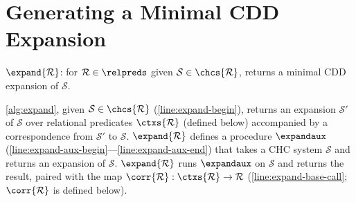 \section{Generating a Minimal CDD Expansion}
\label{app:cons-cdd}
\begin{algorithm}[t]
  \caption{$\expand{ \mathcal{R} }$: for $\mathcal{R} \in \relpreds$
    given $\mathcal{S} \in \chcs{ \mathcal{R} }$, returns a minimal
    CDD expansion of $\mathcal{S}$. }
  \label{alg:expand}
\end{algorithm}
\autoref{alg:expand}, given $\mathcal{S} \in \chcs{ \mathcal{R} }$
(\autoref{line:expand-begin}), returns an expansion $\mathcal{S}'$ of
$\mathcal{S}$ over relational predicates $\ctxs{ \mathcal{R} }$
(defined below) accompanied by a correspondence from $\mathcal{S}'$ to
$\mathcal{S}$.
%
$\expand{ \mathcal{R} }$ defines a procedure $\expandaux$
(\autoref{line:expand-aux-begin}---\autoref{line:expand-aux-end}) that
takes a CHC system $\mathcal{S}$ and returns an expansion of
$\mathcal{S}$.
%
$\expand{ \mathcal{R} }$ runs $\expandaux$ on $\mathcal{S}$ and
returns the result, paired with the map $\corr{ \mathcal{R} } : \ctxs{
  \mathcal{R} } \to \mathcal{R}$ (\autoref{line:expand-base-call};
$\corr{\mathcal{R}}$ is defined below).

